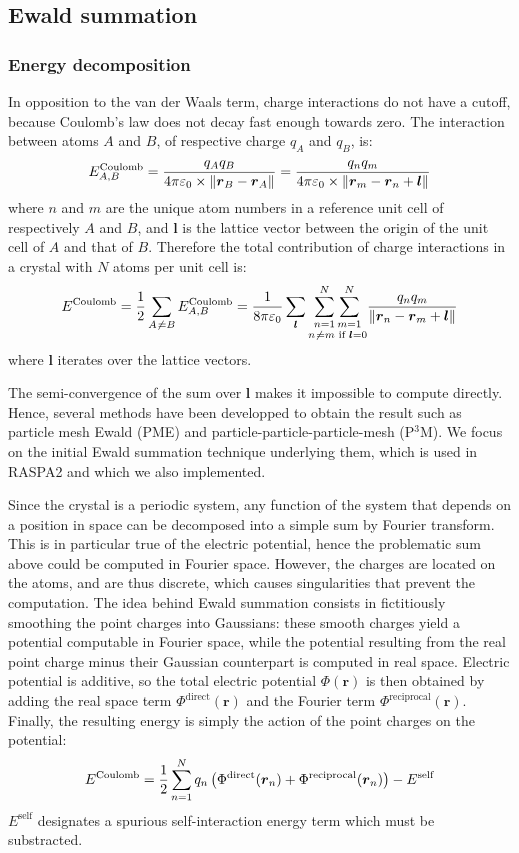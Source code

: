 \documentclass[main.tex]{subfiles}
\begin{document}
\subsection{Ewald summation}

\subsubsection{Energy decomposition}

In opposition to the van der Waals term, charge interactions do not have a cutoff, because Coulomb's law does not decay fast enough towards zero. The interaction between atoms $A$ and $B$, of respective charge $q_A$ and $q_B$, is:
\[E^\text{Coulomb}_{A,B} = \frac{q_A q_B}{4\pi\varepsilon_0\times \left\|\boldsymbol r_B - \boldsymbol r_A\right\|} = \frac{q_n q_m}{4\pi\varepsilon_0\times \left\|\boldsymbol r_m - \boldsymbol r_n + \boldsymbol l\right\|}\]
where $n$ and $m$ are the unique atom numbers in a reference unit cell of respectively $A$ and $B$, and $\boldsymbol l$ is the lattice vector between the origin of the unit cell of $A$ and that of $B$.
Therefore the total contribution of charge interactions in a crystal with $N$ atoms per unit cell is:
\[E^\text{Coulomb} = \frac12\sum_{A\not\kern0.2ex= B}E^\text{Coulomb}_{A,B}
                   = \frac1{8\pi\varepsilon_0}\sum_{\boldsymbol l}\underset{n\not\kern0.2ex= m\text{ if }\boldsymbol l = 0}{\sum_{n=1}^N\sum_{m=1}^N} \frac{q_n q_m}{\left\|\boldsymbol r_n - \boldsymbol r_m + \boldsymbol l\right\|}\]
where $\boldsymbol l$ iterates over the lattice vectors.

The semi-convergence of the sum over $\boldsymbol l$ makes it impossible to compute directly. Hence, several methods have been developped to obtain the result such as particle mesh Ewald (PME) and particle-particle-particle-mesh (P$^3$M). We focus on the initial Ewald summation technique underlying them, which is used in RASPA2 and which we also implemented.

Since the crystal is a periodic system, any function of the system that depends on a position in space can be decomposed into a simple sum by Fourier transform. This is in particular true of the electric potential, hence the problematic sum above could be computed in Fourier space. However, the charges are located on the atoms, and are thus discrete, which causes singularities that prevent the computation. The idea behind Ewald summation consists in fictitiously smoothing the point charges into Gaussians: these smooth charges yield a potential computable in Fourier space, while the potential resulting from the real point charge minus their Gaussian counterpart is computed in real space. Electric potential is additive, so the total electric potential $\Phi(\boldsymbol r)$ is then obtained by adding the real space term $\Phi^\text{direct}(\boldsymbol r)$ and the Fourier term $\Phi^\text{reciprocal}(\boldsymbol r)$. Finally, the resulting energy is simply the action of the point charges on the potential:
\[E^\text{Coulomb} = \frac12\sum_{n=1}^N q_n\left(\Phi^\text{direct}(\boldsymbol r_n) + \Phi^\text{reciprocal}(\boldsymbol r_n)\right) - E^{\text{self}}\]
$E^{\text{self}}$ designates a spurious self-interaction energy term which must be substracted.
\end{document}
